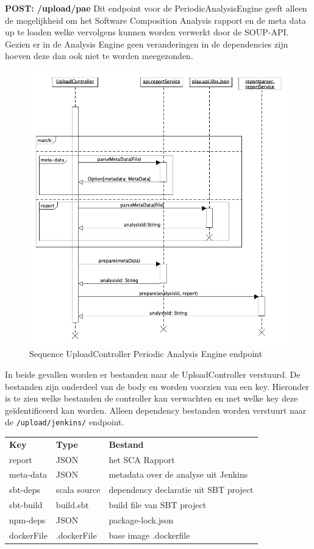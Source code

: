 \textbf{POST: /upload/pae} Dit endpoint voor de PeriodicAnalysisEngine geeft alleen de mogelijkheid om het Software Composition Analysis rapport en de meta data up te loaden welke vervolgens kunnen worden verwerkt door de SOUP-API. Gezien er in de Analysis Engine geen veranderingen in de dependencies zijn hoeven deze dan ook niet te worden meegezonden.

\begin{figure}[bth]
    \myfloatalign
    \includegraphics[width=12cm]{gfx/umlet/exports/SequploadController-pae}
    \caption{Sequence UploadController Periodic Analysis Engine endpoint}
    \label{fig:SequenceUploadReportpaet}
\end{figure}

In beide gevallen worden er bestanden naar de UploadController verstuurd. De bestanden zijn onderdeel van de body en worden voorzien van een key. Hieronder is te zien welke bestanden de controller kan verwachten en met welke key deze geïdentificeerd kan worden. Alleen dependency bestanden worden verstuurt naar de \texttt{/upload/jenkins/} endpoint.

\begin{tabular}{lll}
    \textbf{Key} & \textbf{Type} & \textbf{Bestand} \\
    report & JSON & het SCA Rapport \\
    meta-data & JSON & metadata over de analyse uit Jenkins \\
    sbt-deps & scala source & dependency declaratie uit SBT project \\
    sbt-build & build.sbt  & build file van SBT project\\
    npm-deps & JSON & package-lock.json \\
    dockerFile & .dockerFile & base image .dockerfile\\
\end{tabular} \\


